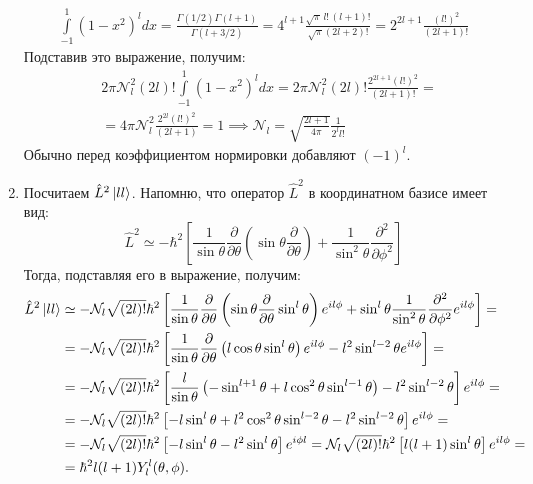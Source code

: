 \begin{enumerate}
    \begin{align*}
        \int\limits_{-1}^1 (1-x^2)^l dx = \frac{\Gamma(1/2)\Gamma(l+1)}{\Gamma(l+3/2)} = 4^{l+1}\frac{\sqrt{\pi} \, l! \, (l+1)!}{\sqrt{\pi}(2l+2)!} = 2^{2l + 1}\frac{(l!)^2}{(2l+1)!}
    \end{align*}
    Подставив это выражение, получим:
    \begin{align*}
         & 2\pi\mathcal{N}^2_l(2l)!\int\limits_{-1}^1 \left(1 - x^2\right)^l dx = 2\pi\mathcal{N}^2_l(2l)!\frac{2^{2l+1}(l!)^2}{(2l+1)!} = \\
         & = 4\pi\mathcal{N}^2_l\frac{2^{2l}(l!)^2}{(2l+1)} = 1 \implies \mathcal{N}_l = \sqrt{\frac{{2l+1}}{4\pi}}\frac{1}{2^ll!}
    \end{align*}
    Обычно перед коэффициентом нормировки добавляют $(-1)^{l}$.
    \item Посчитаем $\hat{L}^2\ket{ll}$. Напомню, что оператор $\hat{L}^2$ в координатном базисе имеет вид: 
    \[
    \hat{L}^2 \simeq -\hbar^2\left[\frac{1}{\sin\theta}\frac{\partial}{\partial \theta}\left( \sin\theta\frac{\partial}{\partial \theta} \right) + \frac{1}{\sin^2\theta}\frac{\partial^2}{\partial\phi^2}\right]
    \]
    Тогда, подставляя его в выражение, получим:
    \begin{align*}
        \hat{L}^2\ket{ll} & \simeq  -\mathcal{N}_l\sqrt{(2l)!} \hbar^2 \left[\frac{1}{\sin\theta} \frac{\partial}{\partial \theta} \left( \sin \theta \frac{\partial}{\partial \theta}\sin^l\theta \right)e^{i l \phi} + \sin^l\theta\frac{1}{\sin^2\theta}\frac{\partial^2}{\partial\phi^2} e^{i l \phi}\right] =\\
        & =  -\mathcal{N}_l\sqrt{(2l)!}\hbar^2\left[\frac{1}{\sin\theta}\frac{\partial}{\partial \theta}\left( l\cos\theta\sin^l\theta \right)e^{i l \phi} - l^2\sin^{l-2}\theta e^{i l \phi}\right] = \\
        & = -\mathcal{N}_l\sqrt{(2l)!}\hbar^2\left[\frac{l}{\sin\theta}\left(-\sin^{l+1}\theta + l\cos^2\theta\sin^{l-1}\theta\right) - l^2\sin^{l-2}\theta\right]e^{i l \phi} = \\
        & = -\mathcal{N}_l\sqrt{(2l)!}\hbar^2\left[-l\sin^{l}\theta + l^2 \cos^2\theta \sin^{l-2}\theta - l^2 \sin^{l-2}\theta \right] e^{i l \phi} = \\
        & = -\mathcal{N}_l\sqrt{(2l)!}\hbar^2\left[-l\sin^{l}\theta - l^2\sin^{l}\theta \right]e^{i\phi l} = \mathcal{N}_l\sqrt{(2l)!}\hbar^2\left[l(l + 1)\sin^l \theta \right]e^{i l \phi} = \\
        & = \hbar^2l(l+1)Y^l_l(\theta, \phi).
    \end{align*}

\end{enumerate}
